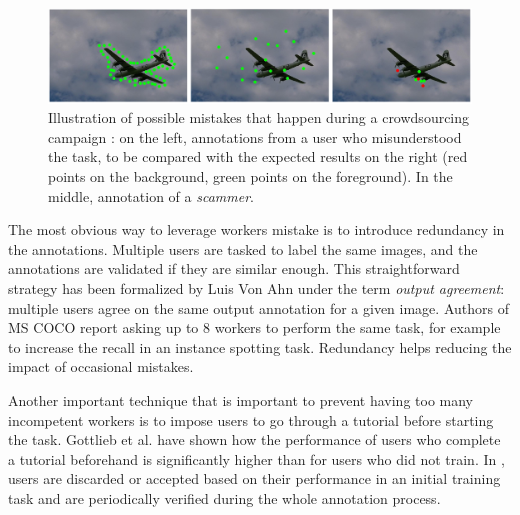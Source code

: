 \begin{figure}[ht]
\centering
\includegraphics[width=\columnwidth]{assets/img/crowdsourcing-errors.png}
\caption{Illustration of possible mistakes that happen during a crowdsourcing campaign  \cite{carlier2016assessment}: on the left, annotations from a user who misunderstood the task, to be compared with the expected results on the right (red points on the background, green points on the foreground). In the middle, annotation of a \textit{scammer}.}%
\label{fig:cs-errors}
\end{figure}

The most obvious way to leverage workers mistake is to introduce redundancy in the annotations. Multiple users are tasked to label the same images, and the annotations are validated if they are similar enough. This straightforward strategy has been formalized by Luis Von Ahn   \cite{von2008designing} under the term \textit{output agreement}: multiple users agree on the same output annotation for a given image. Authors of MS COCO \cite{lin2014microsoft} report asking up to 8 workers to perform the same task, for example to increase the recall in an instance spotting task. Redundancy helps reducing the impact of occasional mistakes. 


Another important technique that is important to prevent having too many incompetent workers is to impose users to go through a tutorial before starting the task. Gottlieb et al. \cite{gottlieb2012pushing} have shown how the performance of users who complete a tutorial beforehand is significantly higher than for users who did not train. In \cite{lin2014mscoco}, users are discarded or accepted based on their performance in an initial training task and are periodically verified during the whole annotation process. 


